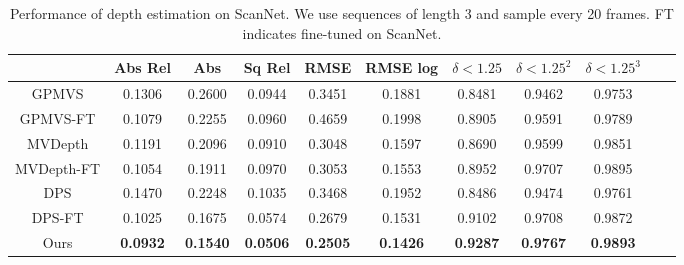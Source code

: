 \documentclass[runningheads]{llncs}
\begin{document}
\begin{table}[t]
  \caption{Performance of depth estimation on ScanNet. We use sequences of length 3 and sample every 20 frames. FT indicates fine-tuned on ScanNet. }
  \centering
\begin{tabular}{ccccccccccc}
 \hline 
     &Abs Rel  &Abs & Sq Rel & RMSE & RMSE log & \textbf{$\delta< 1.25$}& \textbf{$\delta < 1.25^2$}& \textbf{$\delta< 1.25^3$}\\

    \hline
GPMVS &	0.1306 &0.2600  &  0.0944  & 0.3451 & 0.1881 & 0.8481 &  0.9462 &	0.9753	\\
GPMVS-FT  &  0.1079 & 0.2255 & 0.0960 & 0.4659 & 0.1998 & 0.8905 & 0.9591 & 0.9789 \\
MVDepth & 0.1191 & 0.2096 & 0.0910 & 0.3048 & 0.1597 & 0.8690 & 0.9599 & 0.9851 \\
MVDepth-FT & 0.1054 & 0.1911 & 0.0970 & 0.3053 & 0.1553& 0.8952 & 0.9707 & 0.9895  \\
DPS & 0.1470 & 0.2248 & 0.1035 & 0.3468& 0.1952 & 0.8486 & 0.9474 & 0.9761		 \\
DPS-FT &	0.1025 & 0.1675 & 0.0574 & 0.2679 & 0.1531 & 0.9102 & 0.9708 & 0.9872	\\
Ours &	\textbf{0.0932} & \textbf{0.1540} & \textbf{0.0506} & \textbf{0.2505} & \textbf{0.1426}& \textbf{0.9287} & \textbf{0.9767} & \textbf{0.9893} \\
\hline
  \end{tabular}
\label{table2}
\end{table}
\end{document}
